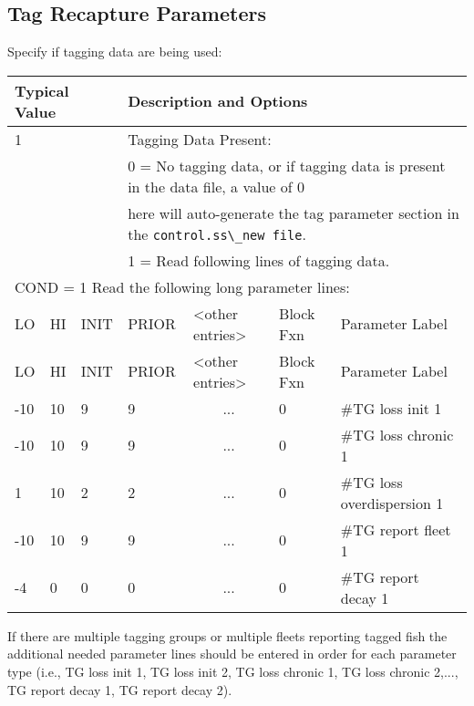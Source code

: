 \hypertarget{tagrecapture}{}
\subsection{Tag Recapture Parameters}
Specify if tagging data are being used:


\begin{longtable}{p{1cm} p{1cm} p{1cm} p{1.5cm} p{2.9cm} p{1.25cm} p{4.25cm}}
	\hline
	\multicolumn{3}{l}{Typical Value} & \multicolumn{4}{l}{Description and Options} \Tstrut\Bstrut\\
	\hline
	\multicolumn{3}{l}{1} & \multicolumn{4}{l}{Tagging Data Present:} \Tstrut\\
	\multicolumn{3}{l}{}  & \multicolumn{4}{l}{0 = No tagging data, or if tagging data is present in the data file, a value of 0} \\
	\multicolumn{3}{l}{}  & \multicolumn{4}{l}{here will auto-generate the tag parameter section in the \verb|control.ss\_new file|.} \\
	\multicolumn{3}{l}{}  & \multicolumn{4}{l}{1 = Read following lines of tagging data.} \Bstrut\\


	\multicolumn{7}{l}{COND = 1 Read the following long parameter lines:} \Tstrut\\
	\hline
	LO \Tstrut & HI & INIT & PRIOR &  <other entries> & Block Fxn & Parameter Label \Bstrut\\
	\hline
	\endfirsthead

	\hline
	LO \Tstrut & HI & INIT & PRIOR & <other entries> & Block Fxn & Parameter Label \Bstrut\\
	\hline
	\endhead

	\hline
	\endfoot
	\endlastfoot

	-10 & 10 & 9 & 9 & \multicolumn{1}{c}{...} & 0 & \#TG loss init 1 \Tstrut\\
	-10 & 10 & 9 & 9 & \multicolumn{1}{c}{...} & 0 & \#TG loss chronic 1 \\
	  1 & 10 & 2 & 2 & \multicolumn{1}{c}{...} & 0 & \#TG loss overdispersion 1 \\
	-10 & 10 & 9 & 9 & \multicolumn{1}{c}{...} & 0 & \#TG report fleet 1 \\
	 -4 &  0 & 0 & 0 & \multicolumn{1}{c}{...} & 0 & \#TG report decay 1 \Bstrut\\
	 \hline
\end{longtable}

If there are multiple tagging groups or multiple fleets reporting tagged fish the additional needed parameter lines should be entered in order for each parameter type (i.e., TG loss init 1, TG loss init 2, TG loss chronic 1, TG loss chronic 2,..., TG report decay 1, TG report decay 2). 

